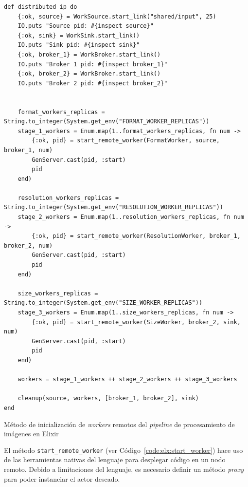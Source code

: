 \documentclass[11pt]{article}
\newcommand{\english}[1]{\textit{#1}}
\begin{document}
\begin{listing}[ht]
\begin{verbatim}
def distributed_ip do
    {:ok, source} = WorkSource.start_link("shared/input", 25)
    IO.puts "Source pid: #{inspect source}"
    {:ok, sink} = WorkSink.start_link()
    IO.puts "Sink pid: #{inspect sink}"
    {:ok, broker_1} = WorkBroker.start_link()
    IO.puts "Broker 1 pid: #{inspect broker_1}"
    {:ok, broker_2} = WorkBroker.start_link()
    IO.puts "Broker 2 pid: #{inspect broker_2}"
    
    
    format_workers_replicas = String.to_integer(System.get_env("FORMAT_WORKER_REPLICAS"))
    stage_1_workers = Enum.map(1..format_workers_replicas, fn num ->
        {:ok, pid} = start_remote_worker(FormatWorker, source, broker_1, num)
        GenServer.cast(pid, :start)
        pid
    end)
    
    resolution_workers_replicas = String.to_integer(System.get_env("RESOLUTION_WORKER_REPLICAS"))
    stage_2_workers = Enum.map(1..resolution_workers_replicas, fn num ->
        {:ok, pid} = start_remote_worker(ResolutionWorker, broker_1, broker_2, num)
        GenServer.cast(pid, :start)
        pid
    end)
    
    size_workers_replicas = String.to_integer(System.get_env("SIZE_WORKER_REPLICAS"))
    stage_3_workers = Enum.map(1..size_workers_replicas, fn num ->
        {:ok, pid} = start_remote_worker(SizeWorker, broker_2, sink, num)
        GenServer.cast(pid, :start)
        pid
    end)
    
    workers = stage_1_workers ++ stage_2_workers ++ stage_3_workers
    
    cleanup(source, workers, [broker_1, broker_2], sink)
end
\end{verbatim}
\caption{Método de inicialización de \english{workers} remotos del \english{pipeline} de procesamiento de imágenes en Elixir}
\label{code:elx:ip}
\end{listing}

El método \lstinline{start_remote_worker} (ver Código~\ref{code:elx:start_worker}) hace uso de las herramientas nativas del lenguaje para desplegar código en un nodo remoto. Debido a limitaciones del lenguaje, es necesario definir un método \english{proxy} para poder instanciar el actor deseado.
\end{document}
